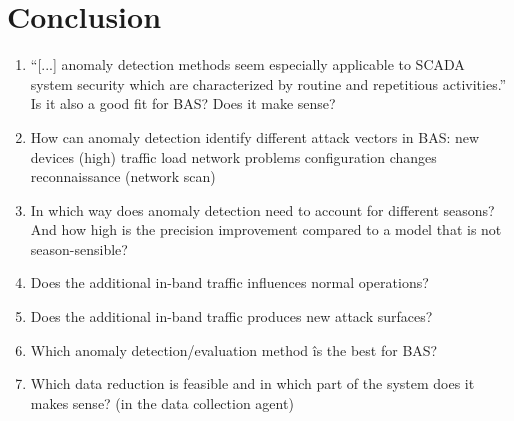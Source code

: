 \section{Conclusion}
\label{sec:results:conclusion}

\begin{enumerate}
	\item \enquote{[...] anomaly detection methods seem especially applicable to SCADA system security which are characterized by routine and repetitious activities.} \parencite{Yang2006} Is it also a good fit for BAS? Does it make sense?
	\item How can anomaly detection identify different attack vectors in BAS:
		\subitem new devices
		\subitem (high) traffic load
		\subitem network problems
		\subitem configuration changes
		\subitem reconnaissance (network scan) 
	\item In which way does anomaly detection need to account for different seasons? And how high is the precision improvement compared to a model that is not season-sensible?
	\item Does the additional in-band traffic influences normal operations?
	\item Does the additional in-band traffic produces new attack surfaces?
	\item Which anomaly detection/evaluation method îs the best for BAS?
	\item Which data reduction is feasible and in which part of the system does it makes sense? (in the data collection agent)
\end{enumerate}

